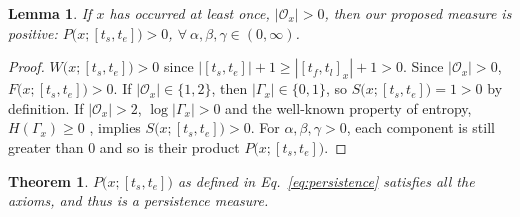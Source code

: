 \documentclass[sigconf]{acmart}
\newtheorem{lemma}{Lemma}
\newtheorem{theorem}{Theorem}
\newcommand{\pattern}{x}
\newcommand{\x}{x}
\newcommand{\intervalStart}{t_s}
\newcommand{\intervalEnd}{t_e}
\newcommand{\interval}{[\intervalStart, \intervalEnd]}
\newcommand{\intervalWidth}{|\interval|}
\newcommand{\occs}{\mathcal{O}}
\newcommand{\firstOcc}{t_f}
\newcommand{\lastOcc}{t_l}
\newcommand{\occInterval}{[\firstOcc,\lastOcc]}
\newcommand{\occIntervalWidth}{|\occInterval_\x|}
\newcommand{\freq}{F}
\newcommand{\freqLong}{\freq\big(x;\interval\big)}
\newcommand{\width}{W}
\newcommand{\widthLong}{\width\big(\pattern; \interval\big)}
\newcommand{\spread}{S}
\newcommand{\spreadLong}{\spread\big(\pattern; \interval\big)}
\newcommand{\entropy}{H}
\newcommand{\persistenceLong}{P\big(x;[\intervalStart,\intervalEnd]\big)}
\newcommand{\gaps}{\Gamma}
\newcommand{\wExp}{\alpha}
\newcommand{\fExp}{\beta}
\newcommand{\sExp}{\gamma}
\begin{document}
\begin{lemma}
    \label{lemma:lower-bounds}
    If $x$ has occurred at least once, $|\occs_\x| > 0$, then our proposed measure is positive: $\persistenceLong > 0$, $\forall \ \wExp, \fExp, \sExp \in (0,\infty)$.
\end{lemma}

\begin{proof}
    $\widthLong > 0$ since $\intervalWidth + 1 \geq \occIntervalWidth + 1 > 0$. 
    Since 
    $|\occs_\x| > 0$, $\freqLong > 0$. 
    If $|\occs_\x| \in \{1, 2\}$, then $|\gaps_\x| \in \{0, 1\}$, so $\spreadLong = 1 > 0$ by definition. If $|\occs_\x| > 2$, $\log|\gaps_\x| > 0$ and the well-known property of entropy, $\entropy(\gaps_\x) \geq 0$ \cite{cover2012elements}, implies $\spreadLong > 0$. For $\wExp, \fExp, \sExp > 0$, each component is still greater than 0 and so is their product $\persistenceLong$.
\end{proof}


\begin{theorem}
    \label{thm:is-persistence-measure}
    $\persistenceLong$ as defined in Eq.~\eqref{eq:persistence} satisfies all the axioms, and thus is a persistence measure.
\end{theorem}
\end{document}
